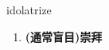 
\begin{frame}
{\huge idolatrize}
\begin{center}
\begin{enumerate}\Large
  \item \textbf{(通常盲目)崇拜}
\end{enumerate}
\end{center}
\end{frame}
